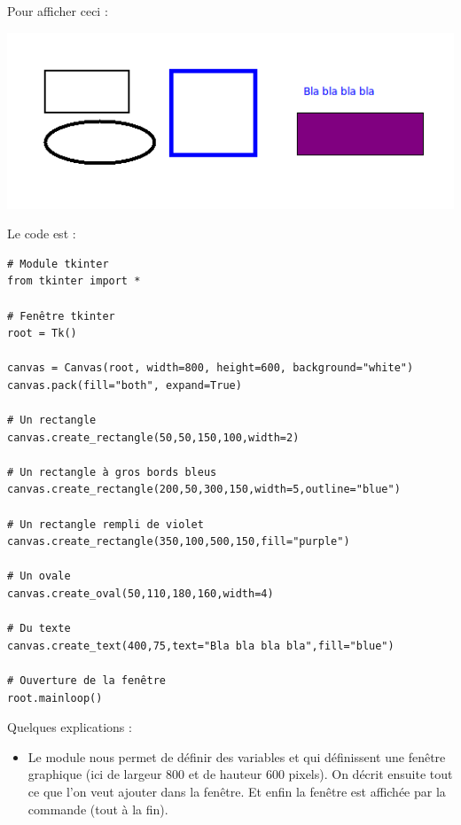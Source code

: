 \documentclass[11pt,class=report,crop=false]{standalone}
\begin{document}

\begin{cours}


Pour afficher ceci :
\begin{center}
\includegraphics[scale=0.6]{ecran-stat-cours-intro}
\end{center}
Le code est :
\begin{lstlisting}
# Module tkinter
from tkinter import *

# Fenêtre tkinter
root = Tk()
        
canvas = Canvas(root, width=800, height=600, background="white")
canvas.pack(fill="both", expand=True)

# Un rectangle
canvas.create_rectangle(50,50,150,100,width=2)

# Un rectangle à gros bords bleus
canvas.create_rectangle(200,50,300,150,width=5,outline="blue")

# Un rectangle rempli de violet
canvas.create_rectangle(350,100,500,150,fill="purple")

# Un ovale
canvas.create_oval(50,110,180,160,width=4)

# Du texte
canvas.create_text(400,75,text="Bla bla bla bla",fill="blue")

# Ouverture de la fenêtre
root.mainloop()
\end{lstlisting}


Quelques explications :
\begin{itemize}
  \item Le module  nous permet de définir des variables  et  qui définissent une fenêtre graphique (ici de largeur $800$ et de hauteur $600$ pixels).
  On décrit ensuite tout ce que l'on veut ajouter dans la fenêtre. Et enfin la fenêtre est affichée par la commande  (tout à la fin). 
  

\end{itemize}
\end{cours}
\end{document}
